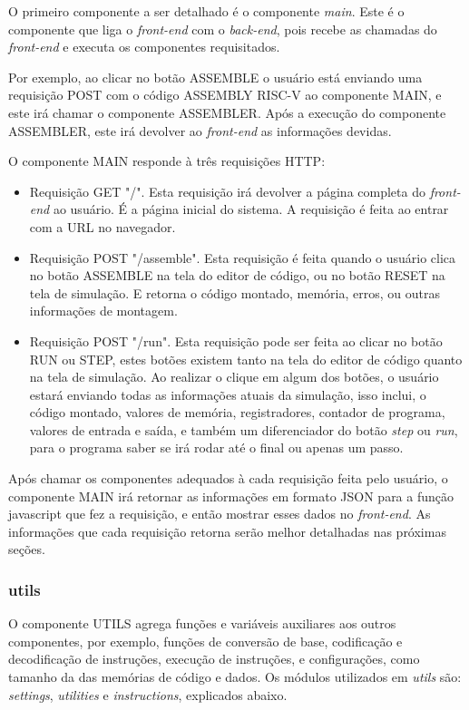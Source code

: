 			O primeiro componente a ser detalhado é o componente \textit{main}. Este é o componente que liga o \textit{front-end} com o \textit{back-end}, pois recebe as chamadas do \textit{front-end} e executa os componentes requisitados. 

			Por exemplo, ao clicar no botão ASSEMBLE o usuário está enviando uma requisição POST com o código ASSEMBLY RISC-V ao componente MAIN, e este irá chamar o componente ASSEMBLER. Após a execução do componente ASSEMBLER, este irá devolver ao \textit{front-end} as informações devidas.

			O componente MAIN responde à três requisições HTTP:
			\begin{itemize}
				\item Requisição GET "/". Esta requisição irá devolver a página completa do \textit{front-end} ao usuário. É a página inicial do sistema. A requisição é feita ao entrar com a URL no navegador.
				\item Requisição POST "/assemble". Esta requisição é feita quando o usuário clica no botão ASSEMBLE na tela do editor de código, ou no botão RESET na tela de simulação. E retorna o código montado, memória, erros, ou outras informações de montagem.
				\item Requisição POST "/run". Esta requisição pode ser feita ao clicar no botão RUN ou STEP, estes botões existem tanto na tela do editor de código quanto na tela de simulação. Ao realizar o clique em algum dos botões, o usuário estará enviando todas as informações atuais da simulação, isso inclui, o código montado, valores de memória, registradores, contador de programa, valores de entrada e saída, e também um diferenciador do botão \textit{step} ou \textit{run}, para o programa saber se irá rodar até o final ou apenas um passo.
			\end{itemize}

			Após chamar os componentes adequados à cada requisição feita pelo usuário, o componente MAIN irá retornar as informações em formato JSON para a função javascript que fez a requisição, e então mostrar esses dados no \textit{front-end}. As informações que cada requisição retorna serão melhor detalhadas nas próximas seções.

		\subsubsection{utils}

			O componente UTILS agrega funções e variáveis auxiliares aos outros componentes, por exemplo, funções de conversão de base, codificação e decodificação de instruções, execução de instruções, e configurações, como tamanho da das memórias de código e dados. Os módulos utilizados em \textit{utils} são: \textit{settings}, \textit{utilities} e \textit{instructions}, explicados abaixo. 

